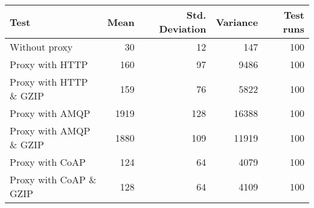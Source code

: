 \begin{tabular}{lrrrr}
\hline
 Test                   &   Mean &   Std. Deviation &   Variance &   Test runs \\
\hline
 Without proxy          &     30 &               12 &        147 &         100 \\
 Proxy with HTTP        &    160 &               97 &       9486 &         100 \\
 Proxy with HTTP \& GZIP &    159 &               76 &       5822 &         100 \\
 Proxy with AMQP        &   1919 &              128 &      16388 &         100 \\
 Proxy with AMQP \& GZIP &   1880 &              109 &      11919 &         100 \\
 Proxy with CoAP        &    124 &               64 &       4079 &         100 \\
 Proxy with CoAP \& GZIP &    128 &               64 &       4109 &         100 \\
\hline
\end{tabular}